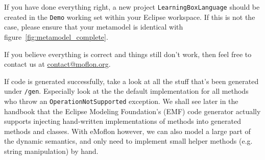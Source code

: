 If you have done everything right, a new project \texttt{LearningBoxLanguage} should be created in the \texttt{Demo} working set within your Eclipse workspace.
If this is not the case, please ensure that your metamodel is identical with figure~\ref{fig:metamodel_complete}.

If you believe everything is correct and things still don't work, then feel free to contact us at \href{mailto:contact@moflon.org}{contact@moflon.org}.

If code is generated successfully, take a look at all the stuff that's been generated under \texttt{/gen}. Especially look at the the default implementation for all methods who throw an  \texttt{OperationNotSupported} exception.
We shall see later in the handbook that the Eclipse Modeling Foundation's (EMF) code generator actually supports injecting hand-written implementations of methods into generated methods and classes.
With eMoflon however, we can also model a large part of the dynamic semantics, and only need to implement small helper methods (e.g. string manipulation) by hand.

